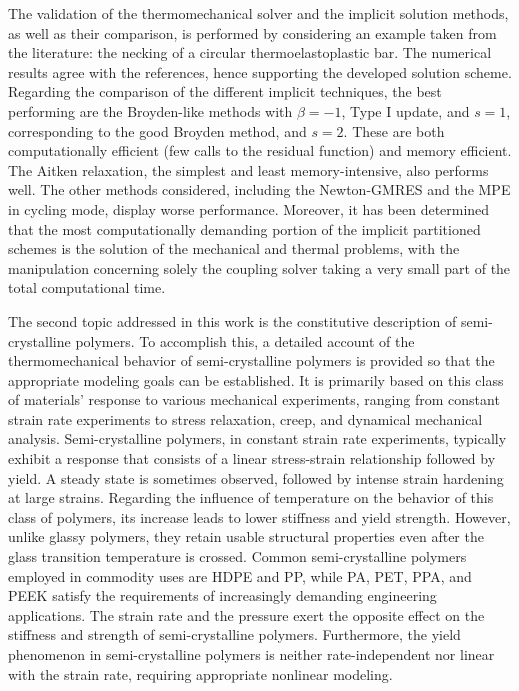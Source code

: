 The validation of the thermomechanical solver and the implicit solution methods, as well as their comparison, is performed by considering an example taken from the literature: the necking of a circular thermoelastoplastic bar.
The numerical results agree with the references, hence supporting the developed solution scheme.
Regarding the comparison of the different implicit techniques, the best performing are the Broyden-like methods with \(\beta=-1\), Type I update, and \(s=1\), corresponding to the good Broyden method, and \(s=2\).
These are both computationally efficient (few calls to the residual function) and memory efficient.
The Aitken relaxation, the simplest and least memory-intensive, also performs well.
The other methods considered, including the Newton-GMRES and the MPE in cycling mode, display worse performance.
Moreover, it has been determined that the most computationally demanding portion of the implicit partitioned schemes is the solution of the mechanical and thermal problems, with the manipulation concerning solely the coupling solver taking a very small part of the total computational time.

The second topic addressed in this work is the constitutive description of semi-crystalline polymers.
To accomplish this, a detailed account of the thermomechanical behavior of semi-crystalline polymers is provided so that the appropriate modeling goals can be established.
It is primarily based on this class of materials' response to various mechanical experiments, ranging from constant strain rate experiments to stress relaxation, creep, and dynamical mechanical analysis.
Semi-crystalline polymers, in constant strain rate experiments, typically exhibit a response that consists of a linear stress-strain relationship followed by yield.
A steady state is sometimes observed, followed by intense strain hardening at large strains.
Regarding the influence of temperature on the behavior of this class of polymers, its increase leads to lower stiffness and yield strength.
However, unlike glassy polymers, they retain usable structural properties even after the glass transition temperature is crossed.
Common semi-crystalline polymers employed in commodity uses are HDPE and PP, while PA, PET, PPA, and PEEK satisfy the requirements of increasingly demanding engineering applications.
The strain rate and the pressure exert the opposite effect on the stiffness and strength of semi-crystalline polymers.
Furthermore, the yield phenomenon in semi-crystalline polymers is neither rate-independent nor linear with the strain rate, requiring appropriate nonlinear modeling.

